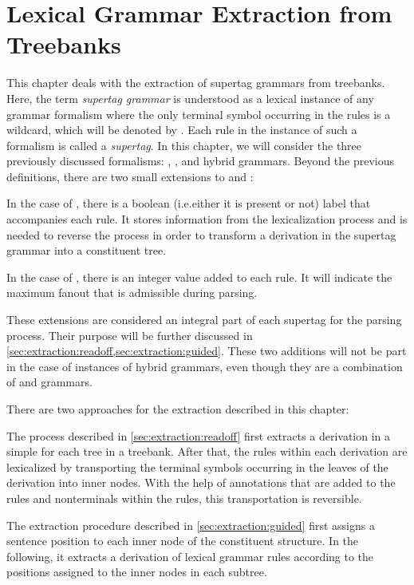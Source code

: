 \documentclass[../document.tex]{subfiles}
\begin{document}
    \chapter{Lexical Grammar Extraction from Treebanks}
    This chapter deals with the extraction of supertag grammars from treebanks.
    Here, the term \emph{supertag grammar} is understood as a lexical instance of any grammar formalism where the only terminal symbol occurring in the rules is a wildcard, which will be denoted by \tn{*}.
    Each rule in the instance of such a formalism is called a \emph{supertag}.
    In this chapter, we will consider the three previously discussed formalisms: , , and hybrid grammars.
    Beyond the previous definitions, there are two small extensions to  and :
    \begin{compactenum}
        \item
            In the case of , there is a boolean (i.e.\@ either it is present or not) label that accompanies each rule.
            It stores information from the lexicalization process and is needed to reverse the process in order to transform a derivation in the supertag grammar into a constituent tree.
        \item
            In the case of , there is an integer value added to each rule.
            It will indicate the maximum fanout that is admissible during parsing.
    \end{compactenum}
    These extensions are considered an integral part of each supertag for the parsing process.
    Their purpose will be further discussed in \cref{sec:extraction:readoff,sec:extraction:guided}.
    These two additions will not be part in the case of instances of hybrid grammars, even though they are a combination of  and  grammars.

    There are two approaches for the extraction described in this chapter:
    \begin{compactenum}
        \item
            The process described in \cref{sec:extraction:readoff} first extracts a derivation in a simple  for each tree in a treebank.
            After that, the rules within each derivation are lexicalized by transporting the terminal symbols occurring in the leaves of the derivation into inner nodes.
            With the help of annotations that are added to the rules and nonterminals within the rules, this transportation is reversible.
        \item
            The extraction procedure described in \cref{sec:extraction:guided} first assigns a sentence position to each inner node of the constituent structure.
            In the following, it extracts a derivation of lexical grammar rules according to the positions assigned to the inner nodes in each subtree.
    \end{compactenum}
\end{document}
